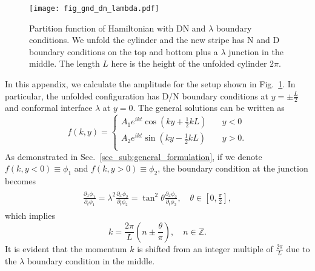 
\begin{figure}[h]
\centering
\texttt{[image: fig\_gnd\_dn\_lambda.pdf]}
\caption{Partition function of Hamiltonian with DN and $\lambda$ boundary conditions. We unfold the cylinder and the new stripe has N and D boundary conditions on the top and bottom plus a $\lambda$ junction in the middle. The length $L$ here is the height of the unfolded cylinder $2\pi$. }
\label{fig:Fig_gnd_dn_lambda}
\end{figure}

In this appendix, we calculate the amplitude for the setup shown in Fig.~\ref{fig:Fig_gnd_dn_lambda}. In particular, the unfolded configuration has D/N boundary conditions at $y = \pm \frac{L}{2}$ and conformal interface $\lambda$ at $y = 0$. The general solutions can be written as
\begin{equation}
\label{eq:normalized_f}
f(k, y) = 
\left\lbrace
\begin{aligned}
  A_1 e^{i kt} \cos\left(ky +\frac{1}{2}kL \right) &  \quad y < 0  \\
  A_2 e^{ikt}  \sin\left(ky - \frac{1}{2}kL \right) & \quad y > 0 .  \\
\end{aligned} \right. 
\end{equation}
As demonstrated in Sec.~\ref{sec_sub:general_formulation}, if we denote $f(k,y<0)\equiv\phi_1$ and $f(k,y>0)\equiv\phi_2$, the boundary condition at the junction becomes
\begin{eqnarray}\begin{aligned}
\frac{\partial_x \phi_1}{ \partial_t \phi_1} = \lambda^2 \frac{\partial_x \phi_2}{ \partial_t \phi_2} = \tan^2 \theta\frac{\partial_x \phi_2}{ \partial_t \phi_2}, \quad \theta \in \left[0,\frac{\pi}{2} \right]  ,
\end{aligned}\end{eqnarray}
which implies
\begin{equation}
\label{eq:momentum_gnd_dn_lambda}
k = \frac{2\pi}{L}\left( n \pm \frac{\theta}{\pi} \right),  \quad n\in\mathbb{Z}.
\end{equation}
It is evident that the momentum $k$ is shifted from an integer multiple of $\frac{2\pi}{L}$ due to the $\lambda$ boundary condition in the middle. 

